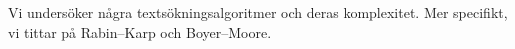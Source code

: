 Vi undersöker några textsökningsalgoritmer och deras komplexitet.
Mer specifikt, vi tittar på Rabin--Karp och Boyer--Moore.
